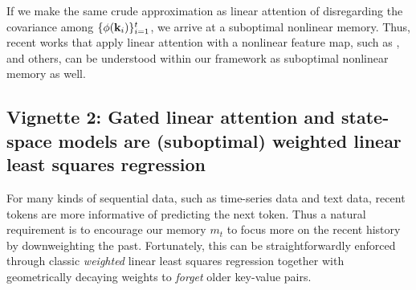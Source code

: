 \documentclass[notitlepage, 11pt]{article}
\newcommand*{\memory}{{m}}
\begin{document}
If we make the same crude approximation as linear attention of disregarding the covariance among $\{\phi(\mathbf{k}_i)\}_{i=1}^t$, we arrive at a suboptimal nonlinear memory.
Thus, recent works that apply linear attention with a nonlinear feature map, such as \citet{Schlag2021LinearTransformersAre,Kasai2021FinetuningPretrainedTransformers,Zhang2023HedgehogPorcupineExpressive,Chen2024DiJiangEfficientLarge}, and others, can be understood within our framework as suboptimal nonlinear memory as well.

\subsection*{Vignette 2: Gated linear attention and state-space models are (suboptimal) weighted linear least squares regression}

For many kinds of sequential data, such as time-series data and text data, recent tokens are more informative of predicting the next token.
Thus a natural requirement is to encourage our memory $\memory_t$ to focus more on the recent history by downweighting the past.
Fortunately, this can be straightforwardly enforced through classic \emph{weighted} linear least squares regression together with geometrically decaying weights to \emph{forget} older key-value pairs.
\end{document}
